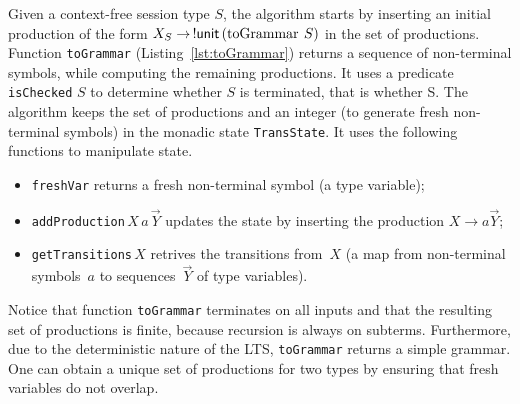 Given a context-free session type $S$, the algorithm starts by
inserting an initial production of the form
$X_S \rightarrow \,\initialProd\,(\toGrammarf\,S)$ in the set of
productions.
%
Function \lstinline|toGrammar| (Listing~\ref{lst:toGrammar}) returns a
sequence of non-terminal symbols, while computing the remaining
productions.
%
It uses a predicate \lstinline|isChecked| $S$ to determine whether $S$
is terminated, that is whether \DONE S.
%
The algorithm keeps the set of productions and an integer (to generate
fresh non-terminal symbols) in the monadic state
\lstinline{TransState}. It uses the following functions to manipulate
state.
%
\begin{itemize}
\item \lstinline{freshVar} returns a fresh non-terminal symbol (a type
  variable);
\item \lstinline{addProduction}$\,X\,a\,\vec Y$ updates the state by inserting
  the production $X\rightarrow a\vec Y$;
\item \lstinline|getTransitions|$\,X$ retrives the transitions
  from~$X$ (a map from non-terminal symbols~$a$ to sequences~$\vec Y$
  of type variables).
\end{itemize}




Notice that function \lstinline|toGrammar| terminates on all inputs and
that the resulting set of productions is finite, because recursion is
always on subterms.
%
Furthermore, due to the deterministic nature of the LTS,
\lstinline|toGrammar| returns a simple grammar.
%
%
One can obtain a unique set of productions for two types by
ensuring that fresh variables do not overlap.

